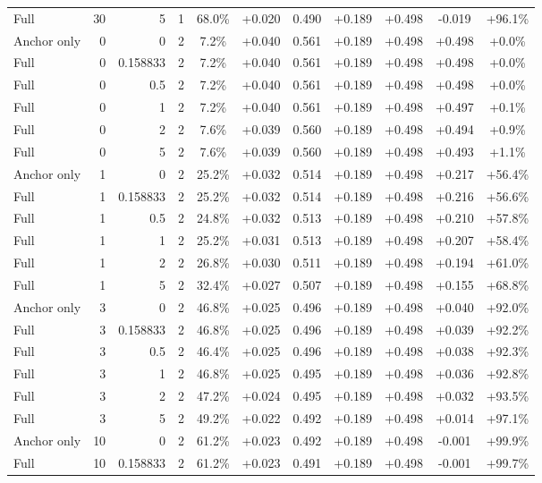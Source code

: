 \begin{table}[htbp]
\begin{tabular}{lrrrccccccc}
Full & 30 & 5 & 1 & 68.0\% & +0.020 & 0.490 & +0.189 & +0.498 & -0.019 & +96.1\% \\
Anchor only & 0 & 0 & 2 & 7.2\% & +0.040 & 0.561 & +0.189 & +0.498 & +0.498 & +0.0\% \\
Full & 0 & 0.158833 & 2 & 7.2\% & +0.040 & 0.561 & +0.189 & +0.498 & +0.498 & +0.0\% \\
Full & 0 & 0.5 & 2 & 7.2\% & +0.040 & 0.561 & +0.189 & +0.498 & +0.498 & +0.0\% \\
Full & 0 & 1 & 2 & 7.2\% & +0.040 & 0.561 & +0.189 & +0.498 & +0.497 & +0.1\% \\
Full & 0 & 2 & 2 & 7.6\% & +0.039 & 0.560 & +0.189 & +0.498 & +0.494 & +0.9\% \\
Full & 0 & 5 & 2 & 7.6\% & +0.039 & 0.560 & +0.189 & +0.498 & +0.493 & +1.1\% \\
Anchor only & 1 & 0 & 2 & 25.2\% & +0.032 & 0.514 & +0.189 & +0.498 & +0.217 & +56.4\% \\
Full & 1 & 0.158833 & 2 & 25.2\% & +0.032 & 0.514 & +0.189 & +0.498 & +0.216 & +56.6\% \\
Full & 1 & 0.5 & 2 & 24.8\% & +0.032 & 0.513 & +0.189 & +0.498 & +0.210 & +57.8\% \\
Full & 1 & 1 & 2 & 25.2\% & +0.031 & 0.513 & +0.189 & +0.498 & +0.207 & +58.4\% \\
Full & 1 & 2 & 2 & 26.8\% & +0.030 & 0.511 & +0.189 & +0.498 & +0.194 & +61.0\% \\
Full & 1 & 5 & 2 & 32.4\% & +0.027 & 0.507 & +0.189 & +0.498 & +0.155 & +68.8\% \\
Anchor only & 3 & 0 & 2 & 46.8\% & +0.025 & 0.496 & +0.189 & +0.498 & +0.040 & +92.0\% \\
Full & 3 & 0.158833 & 2 & 46.8\% & +0.025 & 0.496 & +0.189 & +0.498 & +0.039 & +92.2\% \\
Full & 3 & 0.5 & 2 & 46.4\% & +0.025 & 0.496 & +0.189 & +0.498 & +0.038 & +92.3\% \\
Full & 3 & 1 & 2 & 46.8\% & +0.025 & 0.495 & +0.189 & +0.498 & +0.036 & +92.8\% \\
Full & 3 & 2 & 2 & 47.2\% & +0.024 & 0.495 & +0.189 & +0.498 & +0.032 & +93.5\% \\
Full & 3 & 5 & 2 & 49.2\% & +0.022 & 0.492 & +0.189 & +0.498 & +0.014 & +97.1\% \\
Anchor only & 10 & 0 & 2 & 61.2\% & +0.023 & 0.492 & +0.189 & +0.498 & -0.001 & +99.9\% \\
Full & 10 & 0.158833 & 2 & 61.2\% & +0.023 & 0.491 & +0.189 & +0.498 & -0.001 & +99.7\% \\

\end{tabular}
\end{table}
